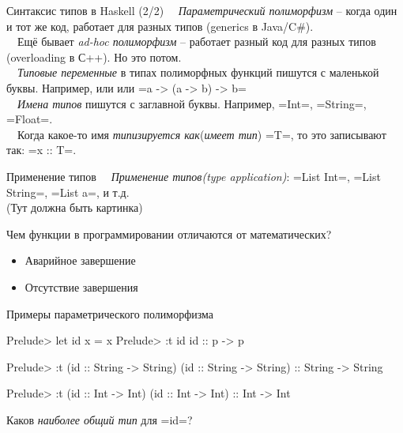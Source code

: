 \documentclass{beamer}
\begin{document}
\begin{frame}{Синтаксис типов в Haskell (2/2)}
~\ \emph{Параметрический полиморфизм} -- когда один и тот же код, работает для 
разных типов (generics в Java/C\#).
\\ \pause
~\ Ещё бывает \emph{ad-hoc полиморфизм} -- работает разный код для разных типов (overloading в С++). Но это потом.
\\ \pause
~\ \emph{Типовые переменные} в типах полиморфных функций пишутся с маленькой буквы. Например,  или  или 
\hsinline=a -> (a -> b) -> b=
\vspace{0.5cm} 
\\ \pause
~\ \emph{Имена типов} пишутся с заглавной буквы. Например,  \inline=Int=, \inline=String=, \inline=Float=.
\vspace{0.5cm} 
\\ \pause
~\ Когда какое-то имя \emph{типизируется как}(\emph{имеет тип}) \inline=T=, то это записывают так: \inline=x :: T=.
\end{frame}

\begin{frame}{Применение типов}
~\ \emph{Применение типов(type application)}: \inline=List Int=, \inline=List String=, \inline=List a=, и т.д. \\
\vspace{1cm}
(Тут должна быть картинка)
 
\end{frame}

\begin{frame}{Чем функции в программировании отличаются от математических?}
 \pause
 \begin{itemize}
  \item Аварийное завершение
  \item Отсутствие завершения
 \end{itemize}
\end{frame}

\begin{frame}[fragile]{Примеры параметрического полиморфизма}
\begin{hslisting}
Prelude> let id x = x
Prelude> :t id
id :: p -> p
\end{hslisting}
\pause
\begin{hslisting}
Prelude> :t (id :: String -> String)
(id :: String -> String) :: String -> String
\end{hslisting}
\pause
\begin{hslisting}
Prelude> :t (id :: Int -> Int)
(id :: Int -> Int) :: Int -> Int
\end{hslisting}
\pause
{\Large \faQuestion} Каков \textit{наиболее общий тип} для \inline=id=?
\end{frame}
\end{document}
